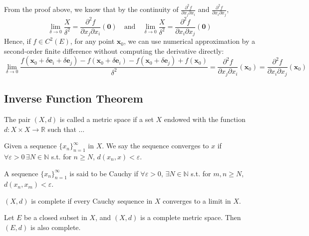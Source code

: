 \begin{rmk}
From the proof above, we know that by the continuity of $\frac{\partial^2 f}{\partial x_j \partial x_i}$ and $\frac{\partial^2 f}{\partial x_i \partial x_j}$,
$$ \lim_{\delta \to 0} \frac{X}{\delta^2} = \frac{\partial^2 f}{\partial x_j \partial x_i}(\mathbf{0}) \quad \text{and} \quad \lim_{\delta \to 0} \frac{X}{\delta^2} = \frac{\partial^2 f}{\partial x_i \partial x_j}(\mathbf{0}) $$
Hence, if $f \in C^2(E)$, for any point $\mathbf{x}_0$, we can use numerical approximation by a second-order finite difference without computing the derivative directly:
$$ \lim_{\delta \to 0} \frac{f(\mathbf{x}_0 + \delta \mathbf{e}_i + \delta \mathbf{e}_j) - f(\mathbf{x}_0 + \delta \mathbf{e}_i) - f(\mathbf{x}_0 + \delta \mathbf{e}_j) + f(\mathbf{x}_0)}{\delta^2} = \frac{\partial^2 f}{\partial x_j \partial x_i}(\mathbf{x}_0) = \frac{\partial^2 f}{\partial x_i \partial x_j}(\mathbf{x}_0) $$
\end{rmk}


\subsection{Inverse Function Theorem}

\begin{definition}
The pair $(X,d)$ is called a metric space if a set $X$ endowed with the function $d:X\times X\to\mathbb{R}$ such that $\dots$
\end{definition}

\begin{definition}[Convergence]
Given a sequence $\{x_n\}_{n=1}^\infty$ in $X$. We say the sequence converges to $x$ if $\forall \varepsilon > 0\,\exists N \in \mathbb{N}$ s.t. for $n \ge N$, $d(x_n, x) < \varepsilon$.
\end{definition}

\begin{definition}
A sequence $\{x_n\}_{n=1}^\infty$ is said to be Cauchy if $\forall \varepsilon > 0$, $\exists N \in \mathbb{N}$ s.t. for $m,n \ge N$, $d(x_n, x_m) < \varepsilon$.
\end{definition}

\begin{definition}[Completeness]
$(X,d)$ is complete if every Cauchy sequence in $X$ converges to a limit in $X$.
\end{definition}

\begin{theorem}
Let $E$ be a closed subset in $X$, and $(X,d)$ is a complete metric space. Then $(E,d)$ is also complete.
\end{theorem}

